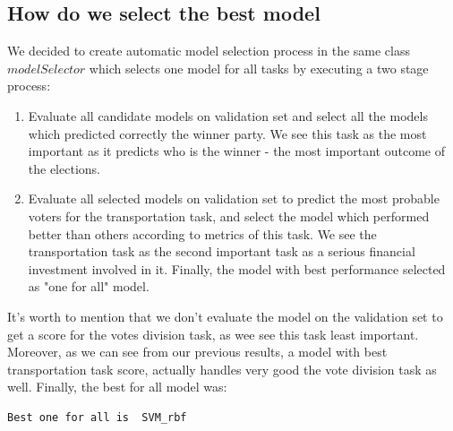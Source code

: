 \documentclass[12pt]{article}
\begin{document}
\subsection{How do we select the best model}
We decided to create automatic model selection process in the same class $modelSelector$ which selects one model for all tasks by executing a two stage process:
\begin{enumerate}
\item Evaluate all candidate models on validation set and select all the models which predicted correctly the winner party. We see this task as the most important as it predicts who is the winner - the most important outcome of the elections.
\item Evaluate all selected models on validation set to predict the most probable voters for the transportation task, and select the model which performed better than others according to metrics of this task. We see the transportation task as the second important task as a serious financial investment involved in it. Finally, the model with best performance selected as "one for all" model. 
\end{enumerate}
It's worth to mention that we don't evaluate the model on the validation set to get a score for the votes division task, as wee see this task least important. Moreover, as we can see from our previous results, a model with best transportation task score, actually handles very good the vote division task as well. Finally, the best for all model was:

\begin{verbatim}
Best one for all is  SVM_rbf
\end{verbatim}
\end{document}

